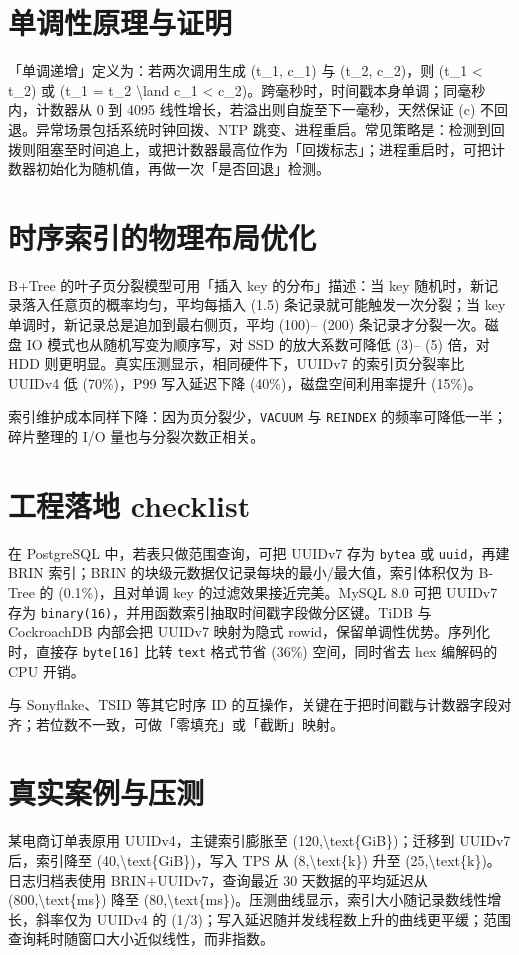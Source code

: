 \chapter{单调性原理与证明}
「单调递增」定义为：若两次调用生成 (t\_{}1, c\_{}1) 与 (t\_{}2, c\_{}2)，则 (t\_{}1 < t\_{}2) 或 (t\_{}1 = t\_{}2 \textbackslash{}land c\_{}1 < c\_{}2)。跨毫秒时，时间戳本身单调；同毫秒内，计数器从 0 到 4095 线性增长，若溢出则自旋至下一毫秒，天然保证 (c) 不回退。异常场景包括系统时钟回拨、NTP 跳变、进程重启。常见策略是：检测到回拨则阻塞至时间追上，或把计数器最高位作为「回拨标志」；进程重启时，可把计数器初始化为随机值，再做一次「是否回退」检测。\par
\chapter{时序索引的物理布局优化}
B+Tree 的叶子页分裂模型可用「插入 key 的分布」描述：当 key 随机时，新记录落入任意页的概率均匀，平均每插入 (1.5) 条记录就可能触发一次分裂；当 key 单调时，新记录总是追加到最右侧页，平均 (100)– (200) 条记录才分裂一次。磁盘 IO 模式也从随机写变为顺序写，对 SSD 的放大系数可降低 (3)– (5) 倍，对 HDD 则更明显。真实压测显示，相同硬件下，UUIDv7 的索引页分裂率比 UUIDv4 低 (70\%{})，P99 写入延迟下降 (40\%{})，磁盘空间利用率提升 (15\%{})。\par
索引维护成本同样下降：因为页分裂少，\texttt{VACUUM} 与 \texttt{REINDEX} 的频率可降低一半；碎片整理的 I/O 量也与分裂次数正相关。\par
\chapter{工程落地 checklist}
在 PostgreSQL 中，若表只做范围查询，可把 UUIDv7 存为 \texttt{bytea} 或 \texttt{uuid}，再建 BRIN 索引；BRIN 的块级元数据仅记录每块的最小/最大值，索引体积仅为 B-Tree 的 (0.1\%{})，且对单调 key 的过滤效果接近完美。MySQL 8.0 可把 UUIDv7 存为 \texttt{binary(16)}，并用函数索引抽取时间戳字段做分区键。TiDB 与 CockroachDB 内部会把 UUIDv7 映射为隐式 rowid，保留单调性优势。序列化时，直接存 \texttt{byte[16]} 比转 \texttt{text} 格式节省 (36\%{}) 空间，同时省去 hex 编解码的 CPU 开销。\par
与 Sonyflake、TSID 等其它时序 ID 的互操作，关键在于把时间戳与计数器字段对齐；若位数不一致，可做「零填充」或「截断」映射。\par
\chapter{真实案例与压测}
某电商订单表原用 UUIDv4，主键索引膨胀至 (120,\textbackslash{}text\{{}GiB\}{})；迁移到 UUIDv7 后，索引降至 (40,\textbackslash{}text\{{}GiB\}{})，写入 TPS 从 (8,\textbackslash{}text\{{}k\}{}) 升至 (25,\textbackslash{}text\{{}k\}{})。日志归档表使用 BRIN+UUIDv7，查询最近 30 天数据的平均延迟从 (800,\textbackslash{}text\{{}ms\}{}) 降至 (80,\textbackslash{}text\{{}ms\}{})。压测曲线显示，索引大小随记录数线性增长，斜率仅为 UUIDv4 的 (1/3)；写入延迟随并发线程数上升的曲线更平缓；范围查询耗时随窗口大小近似线性，而非指数。\par

